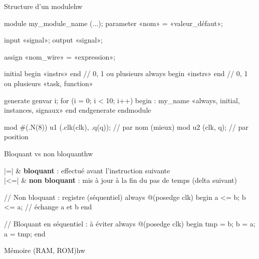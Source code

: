 \documentclass{article}
\begin{document}
\newpage
{}
\noindent
\begin{colonne}[module][col-a]
\begin{bloc}{Structure d'un module}{hw}
\begin{code}
module my_module_name (...);
  parameter «nom» = «valeur_défaut»;

  input  «signal»;
  output «signal»;

  assign «nom_wire» = «expression»;

  initial begin «instrs» end  // 0, 1 ou plusieurs
  always  begin «instrs» end  // 0, 1 ou plusieurs
  «task, function»

  generate
    genvar i;
    for (i = 0; i < 10; i++) begin : my_name
      «always, initial, instances, signaux»
    end
  endgenerate
endmodule
\end{code}
\begin{code}
mod #(.N(8)) u1 (.clk(clk), .q(q)); // par nom (mieux)
mod u2 (clk, q);                    // par position
\end{code}
\end{bloc}

\begin{bloc}{Bloquant vs non bloquant}{hw}
\begin{optab}[6mm]
\V|=|  & \textbf{bloquant} : effectué avant l'instruction suivante \\
\V|<=| & \textbf{non bloquant} : mis à jour à la fin du pas de temps (delta suivant)
\end{optab}
\begin{code}
// Non bloquant : registre (séquentiel)
always @(posedge clk) begin
  a <= b;
  b <= a;                // échange a et b
end

// Bloquant en séquentiel : à éviter
always @(posedge clk) begin
  tmp = b;  b = a;  a = tmp;
end
\end{code}
\end{bloc}

\begin{bloc}{Mémoire (RAM, ROM)}{hw}
\end{bloc}


\end{colonne}
\end{document}
